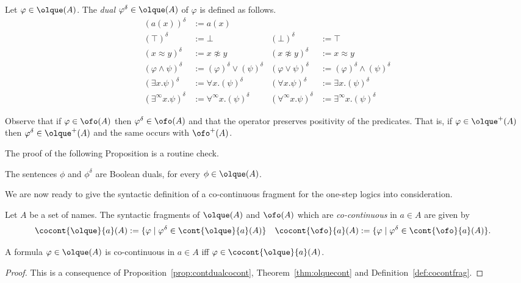 \begin{definition}\label{DEF_dual} 
Let $\varphi \in {\olque}(A)$. 
The \emph{dual} $\varphi^{\delta} \in {\olque}(A)$ of $\varphi$ is defined 
as follows.
\begin{align*}
 (a(x))^{\delta} & :=  a(x) 
\\ (\top)^{\delta} & :=  \bot 
  & (\bot)^{\delta} & :=  \top 
\\  (x \approx y)^{\delta} & :=  x \not\approx y 
  & (x \not\approx y)^{\delta}& :=  x \approx y 
\\ (\varphi \wedge \psi)^{\delta} &:=  (\varphi)^{\delta} \vee (\psi)^{\delta} 
  &(\varphi \vee \psi)^{\delta}& :=  (\varphi)^{\delta} \wedge (\psi)^{\delta}
\\ (\exists x.\psi)^{\delta} &:=  \forall x.(\psi)^{\delta} 
  &(\forall x.\psi)^{\delta} &:=  \exists x.(\psi)^{\delta} 
\\ (\exists^{\infty} x.\psi)^{\delta} &:= \forall^{\infty} x.(\psi)^{\delta} 
  &(\forall^{\infty} x.\psi)^{\delta} &:=  \exists^{\infty} x.(\psi)^{\delta}
\end{align*} %
\end{definition}

\begin{remark}
	Observe that if $\varphi \in {\ofo}(A)$ then $\varphi^{\delta} \in {\ofo}(A)$ and that the operator preserves positivity of the predicates. That is, if $\varphi \in {\olque}^+(A)$ then $\varphi^{\delta} \in {\olque}^+(A)$ and the same occurs with $\ofo^+(A)$.
\end{remark}

The proof of the following Proposition is a routine check.

\begin{proposition}\label{prop:duals}
The sentences $\phi$ and $\phi^{\delta}$ are Boolean duals, for every $\phi 
\in \olque(A)$.
\end{proposition}

We are now ready to give the syntactic definition of a co-continuous fragment for the one-step logics into consideration.

\begin{definition}\label{def:cocontfrag}
	Let $A$ be a set of names. The syntactic fragments of $\olque(A)$ and $\ofo(A)$ which are \emph{co-continuous} in $a\in A$ are given by
	\begin{align*}
		\cocont{\olque}{a}(A) &:= \{\varphi \mid \varphi^\delta \in \cont{\olque}{a}(A)\} &
		\cocont{\ofo}{a}(A) &:= \{\varphi \mid \varphi^\delta \in \cont{\ofo}{a}(A)\} .
	\end{align*}
\end{definition}

\begin{proposition}
	A formula $\varphi \in \olque(A)$ is co-continuous in $a\in A$ iff $\varphi \in \cocont{\olque}{a}(A)$.
\end{proposition}

\begin{proof} This is a consequence of Proposition~\ref{prop:contdualcocont}, Theorem~\ref{thm:olquecont} and Definition~\ref{def:cocontfrag}.
\end{proof}